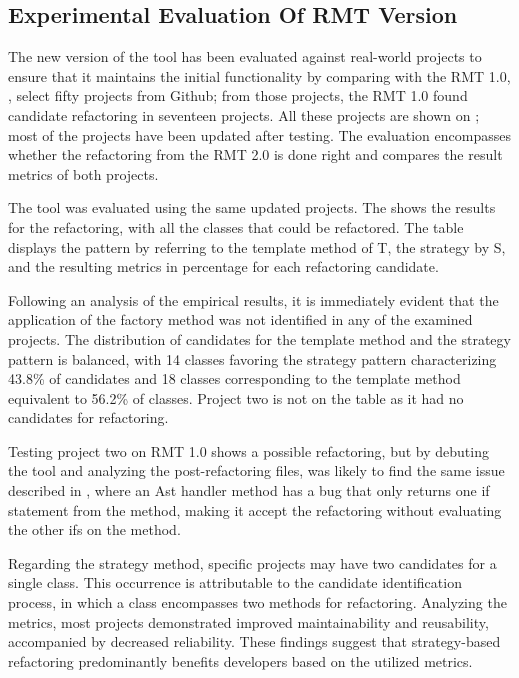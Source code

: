 \subsection{Experimental Evaluation Of RMT Version}
\label{sub-testing-real}

The new version of the tool has been evaluated against real-world projects to ensure that it maintains the initial functionality by comparing with the RMT 1.0, \textcite{beluzzo2018abordagem}, select fifty projects from Github; from those projects, the RMT 1.0 found candidate refactoring in seventeen projects. All these projects are shown on ; most of the projects have been updated after \cite{beluzzo2018abordagem} testing. The evaluation encompasses whether the refactoring from the RMT 2.0 is done right and compares the result metrics of both projects.



The tool was evaluated using the same updated projects. The  shows the results for the refactoring, with all the classes that could be refactored. The table displays the pattern by referring to the template method of T, the strategy by S, and the resulting metrics in percentage for each refactoring candidate.

Following an analysis of the empirical results, it is immediately evident that the application of the factory method was not identified in any of the examined projects. The distribution of candidates for the template method and the strategy pattern is balanced, with 14 classes favoring the strategy pattern characterizing 43.8\% of candidates and 18 classes corresponding to the template method equivalent to 56.2\% of classes. Project two is not on the table as it had no candidates for refactoring.

Testing project two on RMT 1.0 shows a possible refactoring, but by debuting the tool and analyzing the post-refactoring files, was likely to find the same issue described in , where an Ast handler method has a bug that only returns one if statement from the method, making it accept the refactoring without evaluating the other ifs on the method.

Regarding the strategy method, specific projects may have two candidates for a single class. This occurrence is attributable to the candidate identification process, in which a class encompasses two methods for refactoring. Analyzing the metrics, most projects demonstrated improved maintainability and reusability, accompanied by decreased reliability. These findings suggest that strategy-based refactoring predominantly benefits developers based on the utilized metrics.

